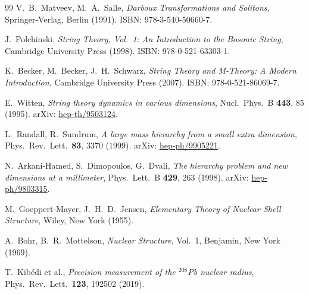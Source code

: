 \documentclass[11pt,a4paper]{article}
\theoremstyle{definition}
\begin{document}
\begin{thebibliography}{99}
V.~B.~Matveev, M.~A.~Salle,
\textit{Darboux Transformations and Solitons},
Springer-Verlag, Berlin (1991).
ISBN: 978-3-540-50660-7.

J.~Polchinski,
\textit{String Theory, Vol.~1: An Introduction to the Bosonic String},
Cambridge University Press (1998).
ISBN: 978-0-521-63303-1.

K.~Becker, M.~Becker, J.~H.~Schwarz,
\textit{String Theory and M-Theory: A Modern Introduction},
Cambridge University Press (2007).
ISBN: 978-0-521-86069-7.

E.~Witten,
\textit{String theory dynamics in various dimensions},
Nucl.\ Phys.\ B \textbf{443}, 85 (1995).
arXiv: \href{https://arxiv.org/abs/hep-th/9503124}{hep-th/9503124}.

L.~Randall, R.~Sundrum,
\textit{A large mass hierarchy from a small extra dimension},
Phys.\ Rev.\ Lett.\ \textbf{83}, 3370 (1999).
arXiv: \href{https://arxiv.org/abs/hep-ph/9905221}{hep-ph/9905221}.

N.~Arkani-Hamed, S.~Dimopoulos, G.~Dvali,
\textit{The hierarchy problem and new dimensions at a millimeter},
Phys.\ Lett.\ B \textbf{429}, 263 (1998).
arXiv: \href{https://arxiv.org/abs/hep-ph/9803315}{hep-ph/9803315}.

M.~Goeppert-Mayer, J.~H.~D.~Jensen,
\textit{Elementary Theory of Nuclear Shell Structure},
Wiley, New York (1955).

A.~Bohr, B.~R.~Mottelson,
\textit{Nuclear Structure}, Vol.~1,
Benjamin, New York (1969).

T.~Kib\'edi et al.,
\textit{Precision measurement of the $^{208}$Pb nuclear radius},
Phys.\ Rev.\ Lett.\ \textbf{123}, 192502 (2019).

\end{thebibliography}

\end{document}
